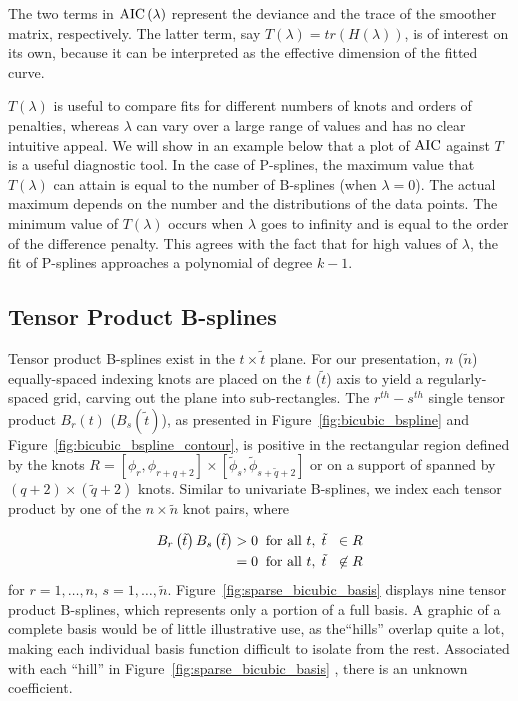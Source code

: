 \documentclass[12pt]{article}
\newcommand*\needsparaphrased{\color{red}}
\newcommand*\outlineskeleton{\color{green}}
\begin{document}
{\needsparaphrased The two terms in $\textup{AIC}\left(\lambda\right)$ represent the deviance and the trace of the smoother matrix, respectively. The latter term, say $T\left(\lambda\right) = tr\left(H\left(\lambda\right)\right)$, is of interest on its own, because it can be interpreted as the effective dimension of the fitted curve.

$T\left(\lambda\right)$ is useful to compare fits for different numbers of knots and orders of penalties, whereas $\lambda$ can vary over a large range of values and has no clear intuitive appeal. We will show in an example below that a plot of $\textup{AIC}$ against $T$ is a useful diagnostic tool. In the case of P-splines, the maximum value that $T\left(\lambda\right)$ can attain is equal to the number of B-splines (when $\lambda = 0$). The actual maximum depends on the number and the distributions of the data points. The minimum value of $T\left(\lambda\right)$ occurs when $\lambda$ goes to infinity and is equal to the order of the difference penalty. This agrees with the fact that for high values of $\lambda$, the fit of P-splines approaches a polynomial of degree $k - 1$.}



\subsection{{\outlineskeleton Tensor Product B-splines}}

Tensor product B-splines exist in the $t \times \tilde{t}$ plane. For our presentation, $n$ ($\tilde{n}$) equally-spaced indexing knots are placed on the $t$ ($\tilde{t}$) axis to yield a regularly-spaced grid, carving out the plane into sub-rectangles. The $r^{th}-s^{th}$ single tensor product $B_r\left(t\right)$ ($B_s\left(\tilde{t}\right)$), as presented in Figure~\ref{fig:bicubic_bspline} and Figure~\ref{fig:bicubic_bspline_contour}, is positive in the rectangular region defined by the knots $R = \left[\phi_r, \phi_{r+q+2}\right] \times \left[\tilde{\phi}_s, \tilde{\phi}_{s+\tilde{q}+2}\right]$ or on a support of spanned by $\left(q + 2\right) \times \left(\tilde{q} + 2\right)$ knots. Similar to univariate B-splines, we index each tensor product by one of the $n\times\tilde{n}$ knot pairs, where

\begin{equation} \nonumber
\begin{split}
B_r\left(\tilde{t}\right)B_s\left(\tilde{t}\right) & > 0 \;\; \textup{for all }  t,\; \tilde{t}\;\ \in R\\
 & = 0 \;\; \textup{for all }  t,\; \tilde{t}\;\ \not\in R
\end{split}
\end{equation}
\noindent
for $r = 1,\dots, n$, $s = 1,\dots, \tilde{n}$. Figure~\ref{fig:sparse_bicubic_basis} displays nine tensor product B-splines, which represents only a portion of a full basis. A graphic of a complete basis would be of little illustrative use, as the``hills'' overlap quite a lot, making each individual basis function difficult to isolate from the rest. Associated with each ``hill'' in Figure~\ref{fig:sparse_bicubic_basis} , there is an unknown coefficient. 
\end{document}
